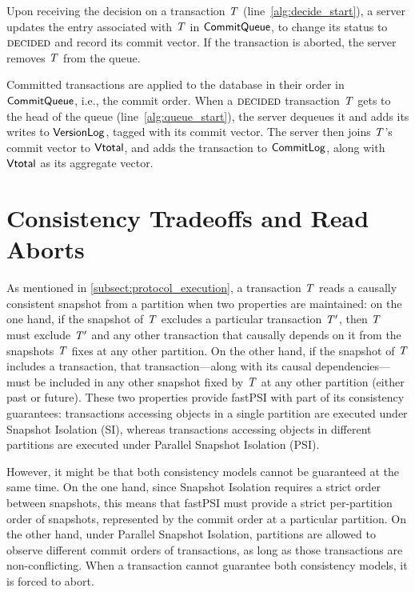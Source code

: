 Upon receiving the decision on a transaction $\mathit{T}$ (line~\ref{alg:decide_start}), a server updates the entry associated with $\mathit{T}$ in $\mathsf{CommitQueue}$, to change its status to $\text{\sc decided}$ and record its commit vector. If the transaction is aborted, the server removes $\mathit{T}$ from the queue.

Committed transactions are applied to the database in their order in $\mathsf{CommitQueue}$, i.e., the commit order. When a $\text{\sc decided}$ transaction $\mathit{T}$ gets to the head of the queue (line~\ref{alg:queue_start}), the server dequeues it and adds its writes to $\mathsf{VersionLog}$, tagged with its commit vector. The server then joins $\mathit{T}$'s commit vector to $\mathsf{Vtotal}$, and adds the transaction to $\mathsf{CommitLog}$, along with $\mathsf{Vtotal}$ as its aggregate vector.

\section{Consistency Tradeoffs and Read Aborts}
\label{sect:read_aborts}

As mentioned in \ref{subsect:protocol_execution}, a transaction $\mathit{T}$ reads a causally consistent snapshot from a partition when two properties are maintained: on the one hand, if the snapshot of $\mathit{T}$ excludes a particular transaction $\mathit{T}'$, then $\mathit{T}$ must exclude $\mathit{T}'$ and any other transaction that causally depends on it from the snapshots $\mathit{T}$ fixes at any other partition. On the other hand, if the snapshot of $\mathit{T}$ includes a transaction, that transaction---along with its causal dependencies---must be included in any other snapshot fixed by $\mathit{T}$ at any other partition (either past or future). These two properties provide fastPSI with part of its consistency guarantees: transactions accessing objects in a single partition are executed under Snapshot Isolation (SI), whereas transactions accessing objects in different partitions are executed under Parallel Snapshot Isolation (PSI).

However, it might be that both consistency models cannot be guaranteed at the same time. On the one hand, since Snapshot Isolation requires a strict order between snapshots, this means that fastPSI must provide a strict per-partition order of snapshots, represented by the commit order at a particular partition. On the other hand, under Parallel Snapshot Isolation, partitions are allowed to observe different commit orders of transactions, as long as those transactions are non-conflicting. When a transaction cannot guarantee both consistency models, it is forced to abort.


